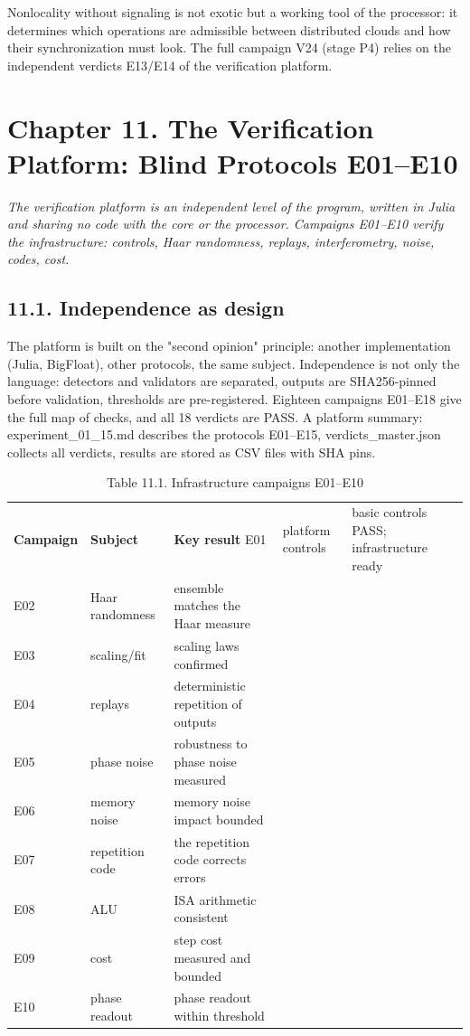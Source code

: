 \documentclass[11pt,a4paper]{article}
\begin{document}
Nonlocality without signaling is not exotic but a working tool of the processor: it determines which operations are admissible between distributed clouds and how their synchronization must look. The full campaign V24 (stage P4) relies on the independent verdicts E13/E14 of the verification platform.

\section{Chapter 11. The Verification Platform: Blind Protocols E01–E10}

\noindent\textit{\color{copper}The verification platform is an independent level of the program, written in Julia and sharing no code with the core or the processor. Campaigns E01–E10 verify the infrastructure: controls, Haar randomness, replays, interferometry, noise, codes, cost.}

\subsection{11.1. Independence as design}

The platform is built on the "second opinion" principle: another implementation (Julia, BigFloat), other protocols, the same subject. Independence is not only the language: detectors and validators are separated, outputs are SHA256-pinned before validation, thresholds are pre-registered. Eighteen campaigns E01–E18 give the full map of checks, and all 18 verdicts are PASS. A platform summary: experiment\_01\_15.md describes the protocols E01–E15, verdicts\_master.json collects all verdicts, results are stored as CSV files with SHA pins.

\begin{table}[htbp]\centering\small
\caption{Table 11.1. Infrastructure campaigns E01–E10}
\begin{tabular}{p{} p{} p{}}
\toprule
\textbf{Campaign} & \textbf{Subject} & \textbf{Key result}
\midrule
E01 & platform controls & basic controls PASS; infrastructure ready \\
E02 & Haar randomness & ensemble matches the Haar measure \\
E03 & scaling/fit & scaling laws confirmed \\
E04 & replays & deterministic repetition of outputs \\
E05 & phase noise & robustness to phase noise measured \\
E06 & memory noise & memory noise impact bounded \\
E07 & repetition code & the repetition code corrects errors \\
E08 & ALU & ISA arithmetic consistent \\
E09 & cost & step cost measured and bounded \\
E10 & phase readout & phase readout within threshold \\
\bottomrule
\end{tabular}
\end{table}
\end{document}
